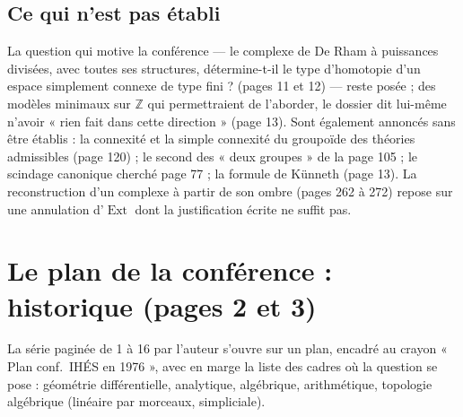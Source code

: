 \documentclass[11pt,a4paper]{article}
\begin{document}
\subsection*{Ce qui n'est pas établi}

La question qui motive la conférence — le complexe de De Rham à puissances
divisées, avec toutes ses structures, détermine-t-il le type d'homotopie d'un
espace simplement connexe de type fini ? (pages 11 et 12) — reste posée ;
des modèles minimaux sur $\mathbb{Z}$ qui permettraient de l'aborder, le
dossier dit lui-même n'avoir « rien fait dans cette direction » (page 13).
Sont également annoncés sans être établis : la connexité et la simple connexité
du groupoïde des théories admissibles (page 120) ; le second des « deux
groupes » de la page 105 ; le scindage canonique cherché page 77 ; la formule
de Künneth (page 13). La reconstruction d'un complexe à partir de son ombre
(pages 262 à 272) repose sur une annulation d'$\operatorname{Ext}$ dont la
justification écrite ne suffit pas.

\section*{Le plan de la conférence : historique (pages 2 et 3)}

La série paginée de 1 à 16 par l'auteur s'ouvre sur un plan, encadré au crayon
« Plan conf.\ IHÉS en 1976 », avec en marge la liste des cadres où la question
se pose : géométrie différentielle, analytique, algébrique, arithmétique,
topologie algébrique (linéaire par morceaux, simpliciale).
\end{document}
